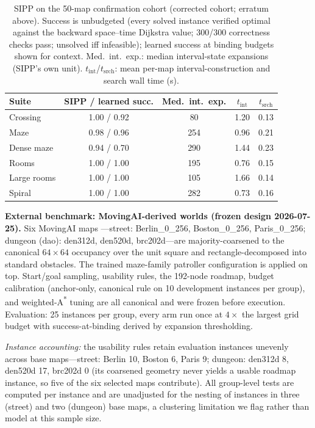 \documentclass[letterpaper]{article} %
\begin{document}
\begin{table}[t]
\centering
\small
\setlength{\tabcolsep}{2.6pt}
\begin{tabular}{@{}lcccc@{}}
\toprule
Suite & SIPP / learned succ. & Med.\ int.\ exp. & $t_{\mathrm{int}}$ & $t_{\mathrm{srch}}$ \\
\midrule
Crossing & 1.00 / 0.92 & 80 & 1.20 & 0.13 \\
Maze & 0.98 / 0.96 & 254 & 0.96 & 0.21 \\
Dense maze & 0.94 / 0.70 & 290 & 1.44 & 0.23 \\
Rooms & 1.00 / 1.00 & 195 & 0.76 & 0.15 \\
Large rooms & 1.00 / 1.00 & 105 & 1.66 & 0.14 \\
Spiral & 1.00 / 1.00 & 282 & 0.73 & 0.16 \\
\bottomrule
\end{tabular}
\caption{SIPP on the 50-map confirmation cohort (corrected cohort; erratum above). Success is unbudgeted (every solved instance verified optimal against the backward space--time Dijkstra value; 300/300 correctness checks pass; unsolved iff infeasible); learned success at binding budgets shown for context. Med.\ int.\ exp.: median interval-state expansions (SIPP's own unit). $t_{\mathrm{int}}$/$t_{\mathrm{srch}}$: mean per-map interval-construction and search wall time (s).}
\label{tab:sipp}
\end{table}

\textbf{External benchmark: MovingAI-derived worlds (frozen design 2026-07-25).} Six MovingAI maps \citep{sturtevant2012movingai}---street: Berlin\_0\_256, Boston\_0\_256, Paris\_0\_256; dungeon (dao): den312d, den520d, brc202d---are majority-coarsened to the canonical $64{\times}64$ occupancy over the unit square and rectangle-decomposed into standard obstacles. The trained maze-family patroller configuration is applied on top. Start/goal sampling, usability rules, the 192-node roadmap, budget calibration (anchor-only, canonical rule on 10 development instances per group), and weighted-A\textsuperscript{*} tuning are all canonical and were frozen before execution. Evaluation: 25 instances per group, every arm run once at $4\times$ the largest grid budget with success-at-binding derived by expansion thresholding.

\emph{Instance accounting:} the usability rules retain evaluation instances unevenly across base maps---street: Berlin 10, Boston 6, Paris 9; dungeon: den312d 8, den520d 17, brc202d 0 (its coarsened geometry never yields a usable roadmap instance, so five of the six selected maps contribute). All group-level tests are computed per instance and are unadjusted for the nesting of instances in three (street) and two (dungeon) base maps, a clustering limitation we flag rather than model at this sample size.
\end{document}
